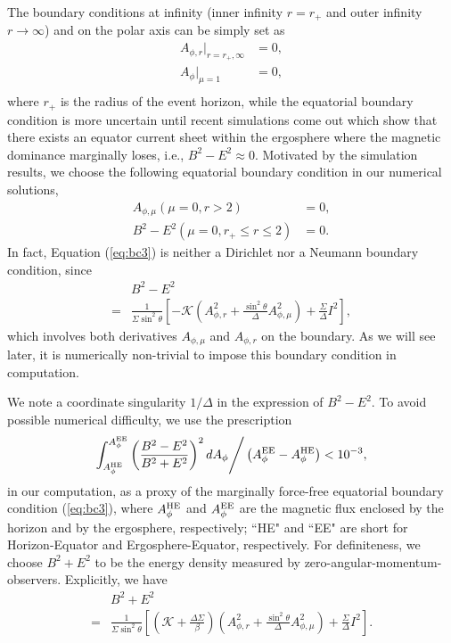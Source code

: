 \documentclass[aps,prd,reprint,nofootinbib, superscriptaddress]{revtex4-1}
\def\sst{\sin^2\theta}
\def\Ar{A_{\phi,r}}
\def\Am{A_{\phi,\mu}}
\def\be{\begin{equation}}
\def\ee{\end{equation}}
\def\AHE{A_\phi^{\rm HE}}
\def\AEE{A_\phi^{\rm EE}}
\begin{document}
The boundary conditions at infinity (inner infinity $r=r_+$ and outer infinity $r\rightarrow\infty$)
and on the polar axis can be simply set as
\be
\begin{aligned}
\Ar|_{r=r_+, \infty} &= 0, \\
A_\phi|_{\mu = 1} &= 0,\\
\end{aligned}
\ee
where $r_+$ is the radius of the event horizon,
while the equatorial boundary condition is more uncertain until recent simulations \cite{East2018}
come out which show that there exists an equator current sheet within the ergosphere where the
magnetic dominance marginally loses, i.e., $B^2-E^2\approx 0$. Motivated by the simulation results,
we choose the following equatorial boundary condition in our numerical solutions,
\begin{subequations}
\begin{align}
    \Am(\mu = 0, r > 2) &= 0, \label{eq:bc2}\\
    B^2-E^2 (\mu = 0, r_+ \leq r \leq 2) &=0.\label{eq:bc3}
\end{align}
\end{subequations}
In fact, Equation (\ref{eq:bc3})
is neither a Dirichlet nor a Neumann boundary condition, since
\be
\begin{aligned}
&B^2-E^2 \\
= & \frac{1}{\Sigma \sst} \left[ -\mathcal{K} \left(\Ar^2 +\frac{\sst}{\Delta}\Am^2 \right)+\frac{\Sigma}{\Delta}I^2\right],
\end{aligned}
\ee
which involves both derivatives $\Am$ and $\Ar$ on the boundary.
As we will see later, it is numerically non-trivial to impose this boundary condition in computation.

We note a coordinate singularity $1/\Delta$ in the expression of $B^2-E^2$.
To avoid possible numerical difficulty, we use the prescription
\be
\label{eq:nbc}
\int_{A_\phi^{\rm HE}}^{A_\phi^{\rm EE}} \left(\frac{B^2-E^2}{B^2+E^2}\right)^2 dA_\phi \Bigg/ \left(A_\phi^{\rm EE}- A_\phi^{\rm HE}\right)  < 10^{-3},
\ee
in our computation, as a proxy of the marginally force-free equatorial boundary condition (\ref{eq:bc3}),
where $\AHE$ and $\AEE$ are the magnetic flux enclosed by the horizon and by the ergosphere, respectively;
``HE" and ``EE" are short for Horizon-Equator and Ergosphere-Equator, respectively.
For definiteness, we choose $B^2+E^2$ to be the energy density measured by zero-angular-momentum-observers.
Explicitly, we have
\be
\begin{aligned}
 & B^2+E^2   \\
=& \frac{1}{\Sigma \sst} \left[ \left(\mathcal{K}+\frac{\Delta\Sigma}{\beta} \right)
 \left(\Ar^2 +\frac{\sst}{\Delta}\Am^2 \right)
 +\frac{\Sigma}{\Delta}I^2\right] .
\end{aligned}
\ee
\end{document}
